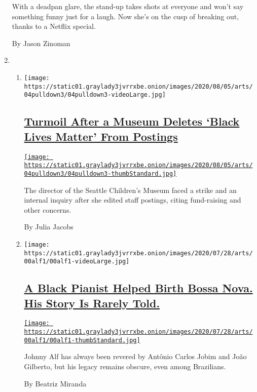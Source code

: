 \begin{enumerate}
  With a deadpan glare, the stand-up takes shots at everyone and won't
  say something funny just for a laugh. Now she's on the cusp of
  breaking out, thanks to a Netflix special.

  By Jason Zinoman
\item
  \begin{enumerate}
  \def\labelenumii{\arabic{enumii}.}
  \item
    \texttt{[image: https://static01.graylady3jvrrxbe.onion/images/2020/08/05/arts/04pulldown3/04pulldown3-videoLarge.jpg]}

    \hypertarget{turmoil-after-a-museum-deletes-black-lives-matter-from-postings}{%
    \subsection{\texorpdfstring{\href{/2020/08/04/arts/design/seattle-childrens-museum.html}{Turmoil
    After a Museum Deletes `Black Lives Matter' From
    Postings}}{Turmoil After a Museum Deletes `Black Lives Matter' From Postings}}\label{turmoil-after-a-museum-deletes-black-lives-matter-from-postings}}

    \href{/2020/08/04/arts/design/seattle-childrens-museum.html}{\texttt{[image: https://static01.graylady3jvrrxbe.onion/images/2020/08/05/arts/04pulldown3/04pulldown3-thumbStandard.jpg]}}

    The director of the Seattle Children's Museum faced a strike and an
    internal inquiry after she edited staff postings, citing
    fund-raising and other concerns.

    By Julia Jacobs
  \item
    \texttt{[image: https://static01.graylady3jvrrxbe.onion/images/2020/07/28/arts/00alf1/00alf1-videoLarge.jpg]}

    \hypertarget{a-black-pianist-helped-birth-bossa-nova-his-story-is-rarely-told}{%
    \subsection{\texorpdfstring{\href{/2020/08/04/arts/music/johnny-alf-bossa-nova.html}{A
    Black Pianist Helped Birth Bossa Nova. His Story Is Rarely
    Told.}}{A Black Pianist Helped Birth Bossa Nova. His Story Is Rarely Told.}}\label{a-black-pianist-helped-birth-bossa-nova-his-story-is-rarely-told}}

    \href{/2020/08/04/arts/music/johnny-alf-bossa-nova.html}{\texttt{[image: https://static01.graylady3jvrrxbe.onion/images/2020/07/28/arts/00alf1/00alf1-thumbStandard.jpg]}}

    Johnny Alf has always been revered by Antônio Carlos Jobim and João
    Gilberto, but his legacy remains obscure, even among Brazilians.

    By Beatriz Miranda
  \end{enumerate}
\end{enumerate}

